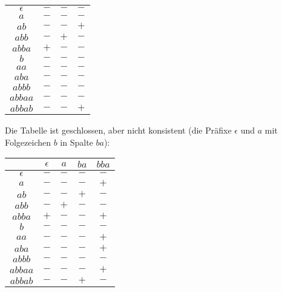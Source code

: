 \documentclass[11pt,a4paper]{article}
\begin{document}
{{\begin{loesung}
\begin{enumerate}
\begin{table}[h!]
\begin{tabular}{c|ccc}
                \hline
                $\epsilon$ & $-$ & $-$ & $-$ \\
                $a$ & $-$ & $-$ & $-$ \\
                $ab$ & $-$ & $-$ & $+$ \\
                $abb$ & $-$ & $+$ & $-$ \\
                $abba$ & $+$ & $-$ & $-$ \\
                \hline
                $b$ & $-$ & $-$ & $-$ \\
                $aa$ & $-$ & $-$ & $-$ \\
                $aba$ & $-$ & $-$ & $-$ \\
                $abbb$ & $-$ & $-$ & $-$ \\
                $abbaa$ & $-$ & $-$ & $-$ \\
                $abbab$ & $-$ & $-$ & $+$ \\
            \end{tabular}
        \end{table}
        \FloatBarrier
        Die Tabelle ist geschlossen, aber nicht konsistent (die Präfixe $\epsilon$ und $a$ mit Folgezeichen $b$ in Spalte $ba$):
        \begin{table}[h!]
            \centering
            \begin{tabular}{c|cccc}
                & $\epsilon$ & $a$ & $ba$ & $bba$ \\
                \hline
                $\epsilon$ & $-$ & $-$ & $-$ & $-$ \\
                $a$ & $-$ & $-$ & $-$ & $+$ \\
                $ab$ & $-$ & $-$ & $+$ & $-$ \\
                $abb$ & $-$ & $+$ & $-$ & $-$ \\
                $abba$ & $+$ & $-$ & $-$ & $+$ \\
                \hline
                $b$ & $-$ & $-$ & $-$ & $-$ \\
                $aa$ & $-$ & $-$ & $-$ & $+$ \\
                $aba$ & $-$ & $-$ & $-$ & $+$ \\
                $abbb$ & $-$ & $-$ & $-$ & $-$ \\
                $abbaa$ & $-$ & $-$ & $-$ & $+$ \\
                $abbab$ & $-$ & $-$ & $+$ & $-$ \\
            \end{tabular}
        \end{table}

\end{enumerate}
\end{loesung}}}
\end{document}
